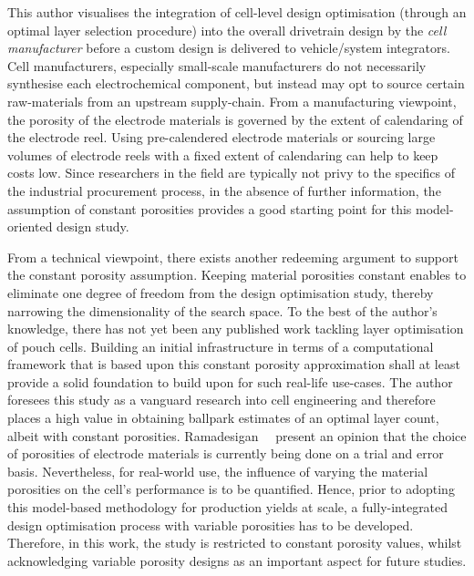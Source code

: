 This  author  visualises  the  integration  of  cell-level  design  optimisation
(through  an optimal  layer  selection procedure)  into  the overall  drivetrain
design  by the  \emph{cell manufacturer}  before  a custom  design is  delivered
to  vehicle/system  integrators.   Cell  manufacturers,  especially  small-scale
manufacturers do not necessarily  synthesise each electrochemical component, but
instead may opt  to source certain raw-materials from  an upstream supply-chain.
From  a  manufacturing  viewpoint,  the  porosity  of  the  electrode  materials
is  governed  by  the  extent  of  calendaring  of  the  electrode  reel.  Using
pre-calendered electrode materials or sourcing  large volumes of electrode reels
with a fixed extent of calendaring can help to keep costs low. Since researchers
in  the  field are  typically  not  privy to  the  specifics  of the  industrial
procurement process,  in the absence  of further information, the  assumption of
constant  porosities provides  a  good starting  point  for this  model-oriented
design study.

From a technical  viewpoint, there exists another redeeming  argument to support
the constant  porosity assumption. Keeping material  porosities constant enables
to  eliminate  one  degree  of  freedom  from  the  design  optimisation  study,
thereby narrowing  the dimensionality of  the search space.  To the best  of the
author's knowledge,  there has not  yet been  any published work  tackling layer
optimisation  of  pouch  cells.  Building an  initial  infrastructure  in  terms
of  a  computational  framework  that  is  based  upon  this  constant  porosity
approximation  shall at  least  provide a  solid foundation  to  build upon  for
such  real-life  use-cases.  The  author  foresees  this  study  as  a  vanguard
research into  cell engineering and therefore  places a high value  in obtaining
ballpark estimates of  an optimal layer count, albeit  with constant porosities.
Ramadesigan~\etal~\cite{Ramadesigan2012} present  an opinion that the  choice of
porosities of electrode  materials is currently being done on  a trial and error
basis. Nevertheless, for  real-world use, the influence of  varying the material
porosities  on the  cell's  performance is  to be  quantified.  Hence, prior  to
adopting  this  model-based  methodology  for  production  yields  at  scale,  a
fully-integrated design optimisation process with  variable porosities has to be
developed. Therefore, in this work, the study is restricted to constant porosity
values, whilst  acknowledging variable porosity  designs as an  important aspect
for future studies.

